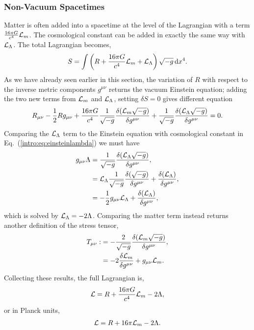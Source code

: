 \subsubsection*{Non-Vacuum Spacetimes}
Matter is often added into a spacetime at the level of the Lagrangian with a term $\frac{16 \pi G}{c^4}\mathcal{L}_m$. The cosmological constant can be added in exactly the same way with $\mathcal{L}_\Lambda$. The total Lagrangian becomes,
\begin{equation}
S = \int \left({R} + \frac{16 \pi G}{c^4} \mathcal{L}_m + \mathcal{L}_\Lambda \right)\sqrt{-g} \,\dd x^4.
\end{equation}
As we have already seen earlier in this section, the variation of $R$ with respect to the inverse metric components $g^{\mu\nu}$ returns the vacuum Einstein equation; adding the two new terms from $\mathcal{L}_m$ and $\mathcal{L}_\Lambda$, setting $\delta S =0$ gives different equation
\begin{equation}
R_{\mu\nu} - \frac{1}{2}Rg_{\mu\nu} + \frac{16 \pi G}{c^4}\frac{1}{\sqrt{-g}}\frac{\delta( \mathcal{L}_m \sqrt{-g})}{\delta g^{\mu\nu}} + \frac{1}{\sqrt{-g}}\frac{\delta (\mathcal{L}_\Lambda \sqrt{-g})}{\delta g^{\mu\nu}} = 0.
\end{equation}
Comparing the $\mathcal{L}_\Lambda$ term to the Einstein equation with cosmological constant in Eq.~(\ref{intro:eq:einsteinlambda}) we must have
\begin{align}
g_{\mu\nu} \Lambda &= \frac{1}{\sqrt{-g}}\frac{\delta (\mathcal{L}_\Lambda \sqrt{-g})}{\delta g^{\mu\nu}} , \\
&= \mathcal{L}_\Lambda \frac{1}{\sqrt{-g}}\frac{\delta ( \sqrt{-g})}{\delta g^{\mu\nu}} + \frac{\delta (\mathcal{L}_\Lambda )}{\delta g^{\mu\nu}}, \\
&=-\frac{1}{2}g_{\mu\nu}\mathcal{L}_\Lambda  + \frac{\delta (\mathcal{L}_\Lambda )}{\delta g^{\mu\nu}}, \\
\end{align}
which is solved by $\mathcal{L}_\Lambda = -2\Lambda$. Comparing the matter term instead returns another definition of the stress tensor,
\begin{align}
T_{\mu\nu}:&=-\frac{2}{\sqrt{-g}}\frac{\delta (\mathcal{L}_m \sqrt{-g})}{\delta g^{\mu\nu}},\\
&= -2\frac{\delta \mathcal{L}_m}{\delta g^{\mu\nu}} + g_{\mu\nu} \mathcal{L}_m .\label{intro:eq:Tdef}
\end{align} 
Collecting these results, the full Lagrangian is,
\begin{align}
\mathcal{L} = R + \frac{16 \pi G}{c^4} \mathcal{L}_m -2\Lambda,
\end{align}
or in Planck units,
\begin{align}
\mathcal{L} = R + 16 \pi \mathcal{L}_m -2\Lambda.
\end{align}
